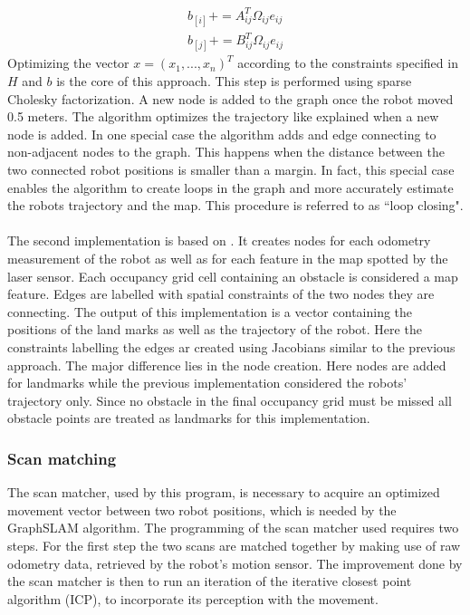 \documentclass{ba-kecs}
\begin{document}
\begin{equation}
\label{eq:b}
\begin{aligned}
	b_{[i]} += A^{T}_{ij} \Omega_{ij} e_{ij} \\
	b_{[j]} += B^{T}_{ij} \Omega_{ij} e_{ij} 
\end{aligned}
\end{equation}
Optimizing the vector \(x = (x_1, ..., x_n)^T \) according to the constraints specified in \(H\) and \(b\) is the core of this approach. This step is performed using sparse Cholesky factorization. 
A new node is added to the graph once the robot moved 0.5 meters. The algorithm optimizes the trajectory like explained when a new node is added. In one special case the algorithm adds and edge connecting to non-adjacent nodes to the graph. This happens when the distance between the two connected robot positions is smaller than a margin. In fact, this special case enables the algorithm to create loops in the graph and more accurately estimate the robots trajectory and the map. This procedure is referred to as ``loop closing". 
\\
\\
The second implementation is based on \cite{Thrun}. It creates nodes for each odometry measurement of the robot as well as for each feature in the map spotted by the laser sensor. Each occupancy grid cell containing an obstacle is considered a map feature. Edges are labelled with spatial constraints of the two nodes they are connecting. The output of this implementation is a vector containing the positions of the land marks as well as the trajectory of the robot. Here the constraints labelling the edges ar created using Jacobians similar to the previous approach. The major difference lies in the node creation. Here nodes are added for landmarks while the previous implementation considered the robots' trajectory only. Since no obstacle in the final occupancy grid must be missed all obstacle points are treated as landmarks for this implementation. 
\subsubsection{Scan matching}

The scan matcher, used by this program, is necessary to acquire an optimized movement vector between two robot positions, which is needed by the GraphSLAM algorithm. The programming of the scan matcher used requires two steps. For the first step the two scans are matched together by making use of raw odometry data, retrieved by the robot's motion sensor. The improvement done by the scan matcher is then to run an iteration of the iterative closest point algorithm (ICP), to incorporate its perception with the movement. 
\end{document}
